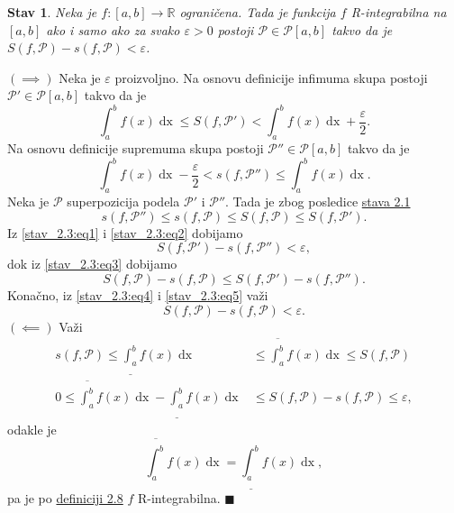 \documentclass{article}
\newtheorem{stav}{Stav}[section]
\DeclareMathOperator{\dx}{dx}
\begin{document}
\begin{stavbox}
    \label{stav_2.3}
    \begin{stav}
        Neka je $f: \left[a,b\right]\longrightarrow\mathbb{R}$ ograničena. Tada je funkcija $f$
        R-integrabilna na $\left[a,b\right]$ ako i samo ako za svako $\varepsilon>0$ postoji
        $\mathcal{P}\in\mathcal{P}\left[a,b\right]$ takvo da je $S\left(f,\mathcal{P}\right)-s\left(f,\mathcal{P}\right)<\varepsilon$.
    \end{stav}
\end{stavbox}
$\left(\implies\right)$ Neka je $\varepsilon$ proizvoljno. Na osnovu definicije infimuma skupa postoji $\mathcal{P}'\in\mathcal{P}\left[a,b\right]$
takvo da je
\begin{equation}
    \label{stav_2.3:eq1}
    \int_{a}^{b}f\left(x\right)\dx\leq S\left(f,\mathcal{P}'\right)<\int_{a}^{b}f\left(x\right)\dx+\frac{\varepsilon}{2}.
\end{equation}
Na osnovu definicije supremuma skupa postoji $\mathcal{P}''\in\mathcal{P}\left[a,b\right]$
takvo da je
\begin{equation}
    \label{stav_2.3:eq2}
    \int_{a}^{b}f\left(x\right)\dx-\frac{\varepsilon}{2}< s\left(f,\mathcal{P}''\right)\leq\int_{a}^{b}f\left(x\right)\dx.
\end{equation}
Neka je $\mathcal{P}$ superpozicija podela $\mathcal{P}'$ i $\mathcal{P}''$. Tada je zbog posledice \hyperref[stav_2.1]{stava 2.1}
\begin{equation}
    \label{stav_2.3:eq3}
    s\left(f,\mathcal{P}''\right)\leq s\left(f,\mathcal{P}\right)\leq S\left(f,\mathcal{P}\right)\leq S\left(f,\mathcal{P}'\right).
\end{equation}
Iz \eqref{stav_2.3:eq1} i \eqref{stav_2.3:eq2} dobijamo
\begin{equation}
    \label{stav_2.3:eq4}
    S\left(f,\mathcal{P}'\right)-s\left(f,\mathcal{P}''\right)<\varepsilon,
\end{equation}
dok iz \eqref{stav_2.3:eq3} dobijamo
\begin{equation}
    \label{stav_2.3:eq5}
    S\left(f,\mathcal{P}\right)-s\left(f,\mathcal{P}\right)\leq S\left(f,\mathcal{P'}\right)-s\left(f,\mathcal{P''}\right).
\end{equation}
Konačno, iz \eqref{stav_2.3:eq4} i \eqref{stav_2.3:eq5} važi
\begin{equation}
    S\left(f,\mathcal{P}\right)-s\left(f,\mathcal{P}\right)<\varepsilon.
\end{equation}
$\left(\impliedby\right)$ Važi
\begin{align*}
    s\left(f,\mathcal{P}\right)\leq\underline{\int_{a}^{b}}f\left(x\right)\dx                 & \leq\overline{\int_{a}^{b}}f\left(x\right)\dx\leq S\left(f,\mathcal{P}\right) \\
    0\leq\overline{\int_{a}^{b}}f\left(x\right)\dx-\underline{\int_{a}^{b}}f\left(x\right)\dx & \leq S\left(f,\mathcal{P}\right)-s\left(f,\mathcal{P}\right)\leq\varepsilon,
\end{align*}
odakle je
$$\overline{\int_{a}^{b}}f\left(x\right)\dx=\underline{\int_{a}^{b}}f\left(x\right)\dx,$$
pa je po \hyperref[definicija_2.8]{definiciji 2.8} $f$ R-integrabilna.
\null\hfill $\blacksquare$\par
\end{document}
